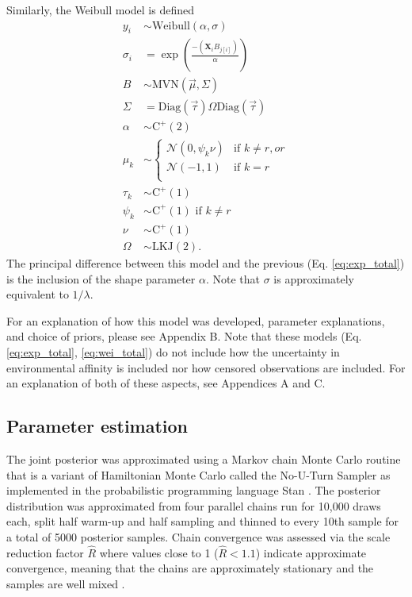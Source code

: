 \documentclass{article}
\begin{document}
Similarly, the Weibull model is defined
\begin{equation}
  \begin{aligned}
    y_{i} &\sim \mathrm{Weibull}(\alpha, \sigma) \\
    \sigma_{i} &= \exp\left(\frac{-(\mathbf{X}_{i} B_{j[i]})}{\alpha}\right) \\
    B &\sim \mathrm{MVN}(\vec{\mu}, \Sigma) \\
    \Sigma &= \text{Diag}(\vec{\tau}) \Omega \text{Diag}(\vec{\tau}) \\
    \alpha &\sim \mathrm{C^{+}}(2) \\
    \mu_{k} &\sim 
    \begin{cases} 
      \mathcal{N}(0, \psi_{k} \nu) & \text{if } k \neq r, or \\
      \mathcal{N}(-1, 1) & \text{if } k = r \\ 
    \end{cases} \\
    \tau_{k} &\sim \mathrm{C^{+}}(1) \\
    \psi_{k} &\sim \mathrm{C^{+}}(1) \text{ if } k \neq r \\
    \nu &\sim \mathrm{C^{+}}(1) \\
    \Omega &\sim \text{LKJ}(2).
  \end{aligned}
  \label{eq:wei_total}
\end{equation}
The principal difference between this model and the previous (Eq. \ref{eq:exp_total}) is the inclusion of the shape parameter \(\alpha\). Note that \(\sigma\) is approximately equivalent to \(1 / \lambda\).

For an explanation of how this model was developed, parameter explanations, and choice of priors, please see Appendix B. Note that these models (Eq. \ref{eq:exp_total}, \ref{eq:wei_total}) do not include how the uncertainty in environmental affinity is included nor how censored observations are included. For an explanation of both of these aspects, see Appendices A and C.

\subsection{Parameter estimation}

The  joint posterior was approximated using a Markov chain Monte Carlo routine that is a variant of Hamiltonian Monte Carlo called the No-U-Turn Sampler \citep{Hoffman2014} as implemented in the probabilistic programming language Stan \citep{2014stan}. The posterior distribution was approximated from four parallel chains run for 10,000 draws each, split half warm-up and half sampling and thinned to every 10th sample for a total of 5000 posterior samples. Chain convergence was assessed via the scale reduction factor \(\hat{R}\) where values close to 1 (\(\hat{R} < 1.1\)) indicate approximate convergence, meaning that the chains are approximately stationary and the samples are well mixed \citep{Gelman2013d}.
\end{document}
